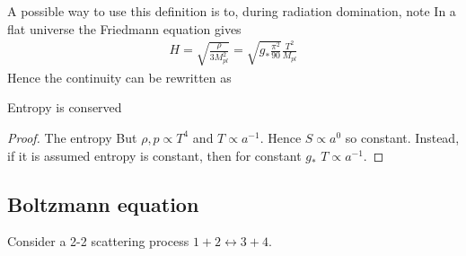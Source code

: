 \documentclass{article}
\begin{document}
\begin{example}
A possible way to use this definition is to, during radiation domination, note 
In a flat universe the Friedmann equation gives 
\begin{align}\label{eq:CSM:5}
H = \sqrt{\frac{\rho}{3 M_{pl}^2}} = \sqrt{g_\ast \frac{\pi^2}{90} } \frac{T^2}{M_{pl}}
\end{align}
Hence the continuity can be rewritten as 
\end{example}

\begin{prop}
Entropy is conserved
\end{prop}
\begin{proof}
The entropy 
But $\rho,p \propto T^4$ and $T\propto a^{-1}$. Hence $S \propto a^0$ so constant. Instead, if it is assumed entropy is constant, then for constant $g_\ast$ $T\propto a^{-1}$. 
\end{proof}

\subsection{Boltzmann equation}
Consider a 2-2 scattering process $1+2 \leftrightarrow 3+4$. 
\end{document}
